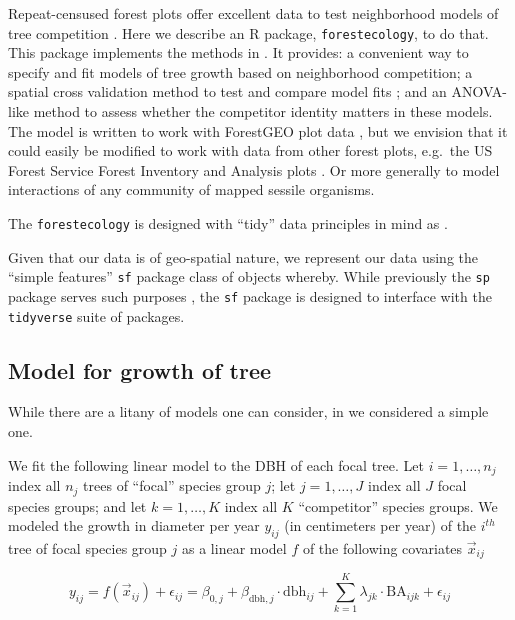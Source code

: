 \documentclass[12pt]{article}
\begin{document}
Repeat-censused forest plots offer excellent data to test neighborhood
models of tree competition \citet{allen_permutation_2020}
\citet{canham_neighborhood_2006} \citet{uriarte_spatially_2004}. Here we
describe an R package, \texttt{forestecology}, to do that. This package
implements the methods in \citet{allen_permutation_2020}. It provides: a
convenient way to specify and fit models of tree growth based on
neighborhood competition; a spatial cross validation method to test and
compare model fits \citet{roberts_cross-validation_2017}; and an
ANOVA-like method to assess whether the competitor identity matters in
these models. The model is written to work with ForestGEO plot data
\citet{andersonteixeira_ctfs-forestgeo_2015}, but we envision that it
could easily be modified to work with data from other forest plots,
e.g.~the US Forest Service Forest Inventory and Analysis plots
\citet{smith_forest_2002}. Or more generally to model interactions of
any community of mapped sessile organisms.

The \texttt{forestecology} is designed with ``tidy'' data principles in
mind as \citet{wickham_welcome_2019}.

Given that our data is of geo-spatial nature, we represent our data
using the ``simple features'' \texttt{sf} package class of objects
\citet{pebesma_simple_2018} whereby. While previously the \texttt{sp}
package serves such purposes \citet{pebesma_sp_2005}, the \texttt{sf}
package is designed to interface with the \texttt{tidyverse} suite of
packages.

\hypertarget{competition-model}{%
\subsection{Model for growth of tree}\label{competition-model}}

While there are a litany of models one can consider, in
\citet{allen_permutation_2020} we considered a simple one.

We fit the following linear model to the DBH of each focal tree. Let
\(i = 1, \ldots, n_j\) index all \(n_j\) trees of ``focal'' species
group \(j\); let \(j = 1, \ldots, J\) index all \(J\) focal species
groups; and let \(k = 1, \ldots, K\) index all \(K\) ``competitor''
species groups. We modeled the growth in diameter per year \(y_{ij}\)
(in centimeters per year) of the \(i^{th}\) tree of focal species group
\(j\) as a linear model \(f\) of the following covariates
\(\vec{x}_{ij}\)

\begin{equation}
\label{eq:model}
y_{ij} = f(\vec{x}_{ij}) + \epsilon_{ij} = \beta_{0,j} + \beta_{\text{dbh},j} \cdot \text{dbh}_{ij} + \sum_{k=1}^{K} \lambda_{jk} \cdot \text{BA}_{ijk} + \epsilon_{ij}
\end{equation}
\end{document}
